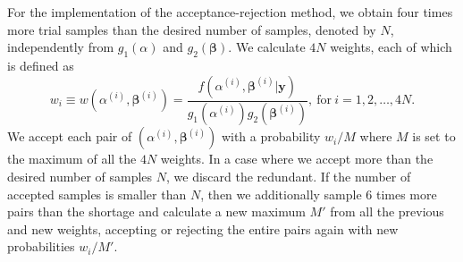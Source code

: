 \documentclass[article]{jss}
\begin{document}
For the  implementation of the acceptance-rejection method, we obtain four times more trial samples than the desired number of samples, denoted by $N$, independently from $g_1(\alpha)$ and $g_2(\boldsymbol{\beta})$. We calculate $4N$ weights, each of which is defined as
\begin{equation}\label{weight}
w_i\equiv w(\alpha^{(i)}, \boldsymbol{\beta}^{(i)})=\frac{f(\alpha^{(i)}, \boldsymbol{\beta}^{(i)}\vert \boldsymbol{y})}{g_1(\alpha^{(i)})g_2( \boldsymbol{\beta}^{(i)})}, ~\textrm{for}~ i=1, 2, \ldots, 4N.
\end{equation}
We accept each pair of $(\alpha^{(i)}, \boldsymbol{\beta}^{(i)})$ with a probability $w_i/M$ where $M$ is set to the maximum of all the $4N$ weights. In a case where we accept more than the desired number of samples $N$, we discard the redundant. If the number of accepted samples is smaller than $N$, then we additionally sample  6 times more pairs than the shortage and calculate a new maximum $M'$ from all the previous and new weights, accepting or rejecting the entire pairs again with new probabilities $w_i/M'$.



\end{document}
